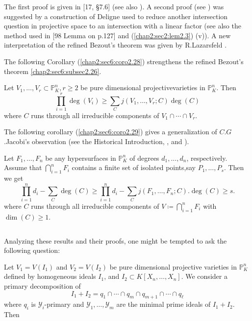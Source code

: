 The first proof is given in [17, \S 7.6] (see also \cite{18}). A second
proof (see \cite{17}) was suggested by a construction of Deligne used to
reduce another intersection question in projective space to an
intersection with a linear factor (see also the method used in [98
  Lemma on p.127] and (\ref{chap2:sec2:lem2.3}) (v)). A new
interpretation of the refined Bezout's theorem was given by
R.Lazarsfeld \cite{45}.  

The following Corollary (\ref{chap2:sec6:coro2.28}) strengthens the
refined Bezout's theorem \ref{chap2:sec6:subsec2.26}. 


\setcounter{corollary}{27}
\begin{corollary}\label{chap2:sec6:coro2.28}%
  Let $V_1,\ldots, V_r \subset \mathbb{P}^n_K, r \geq 2$ be pure
  dimensional projective\pageoriginale varieties in 
  $\mathbb{P}^n_K$. Then  
  $$
  \prod_{i=1}^r \deg (V_i) \geq \sum_C j(V_1,\ldots,V_r;C) \deg (C)
  $$
  where $C$ runs through all irreducible components of $V_1\cap\cdots
  \cap V_r$. 
\end{corollary}

The following corollary (\ref{chap2:sec6:coro2.29}) gives a generalization of
$C.G$.Jacobi's observation (see the Historical Introduction,
\cite{36}, \cite{16} and \cite{60}). 

\setcounter{corollary}{28}
\begin{corollary}\label{chap2:sec6:coro2.29} %
  Let $F_1,\ldots,F_n$ be any hypersurfaces in $\mathbb{P}^n_K$
  of degrees $d_1,\ldots,d_n$, respectively. Assume
  that $\bigcap\limits_{i=1}^n F_i$ contains a finite set of
  isolated points,say $P_1,\ldots,P_s$. Then we get 
  $$
  \prod_{i=1}^n d_i - \sum_C \deg (C) \geq \prod_{i=1}^n d_i -\sum_C
  j(F_1,\ldots,F_n;C).\deg (C)\geq s. 
  $$
  where $C$ runs through all irreducible components of $V \coloneqq
  \bigcap\limits_{i=1}^n F_i$ with $\dim (C) \geq 1$. 
\end{corollary}

\setcounter{subsection}{29}
\subsection{}\label{chap2:sec6:subsec2.30}
Analyzing these results and their proofs, one might be tempted to ask
the following question: 

Let $V_1 = V(I_1)$ and $V_2 = V(I_2)$ be pure dimensional projective
varieties in $\mathbb{P}^n_K$ defined by homogeneous ideals $I_1$, and
$I_2 \subset K[X_n,\ldots,X_n]$. We consider a primary decomposition
of  
$$
I_1+I_2 = q_1 \cap \cdots \cap q_m \cap q_{m+1}\cap \cdots \cap q_\ell 
$$
where $q_i$ is $\mathscr{Y}_i$-primary and
$\mathscr{Y}_1,\ldots,\mathscr{Y}_m$ are the minimal prime ideals of
$I_1+I_2$. Then 

